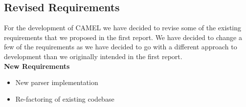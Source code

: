 \subsection{Revised Requirements}
	For the development of CAMEL we have decided to revise some of the existing requirements that we proposed in the first report. We have decided to change a few of the requirements as we have decided to go with a different approach to development than we originally intended in the first report.\\
	
	\textbf{New Requirements}
	\begin{itemize}
		\item New parser implementation
		\item Re-factoring of existing codebase
	\end{itemize}
	